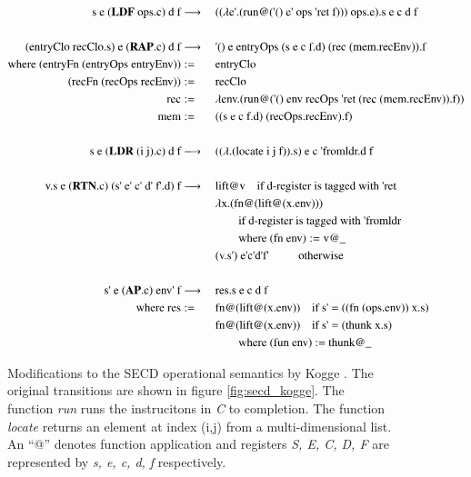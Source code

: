 \documentclass[a4paper,12pt,twoside,openright]{report}
\theoremstyle{definition}
\newcommand{\ts}{\textquotesingle}
\begin{document}
\begin{figure}[htp!]
\centering
\begin{alignat}{5}
		\text{s e (} \mathbf{LDF} \text{ ops.c) d f} & \longrightarrow \: && \text{(($\lambda$e{\ts}.(run@({\ts}() e{\ts} ops {\ts}ret f))) ops.e).s e c d f} \label{eq:secd_sem_ldf} \\
		\nonumber \\%
		\text{(entryClo recClo.s) e (} \mathbf{RAP}\text{.c) d f} & \longrightarrow \: && \text{{\ts}() e entryOps (s e c f.d) (rec (mem.recEnv)).f} \label{eq:secd_sem_rap} \\
		\text{where (entryFn (entryOps entryEnv))} & := && \text{entryClo} \nonumber \\
		\text{(recFn (recOps recEnv))} & := && \text{recClo} \nonumber \\
		\text{rec} & := && \text{$\lambda$env.(run@({\ts}() env recOps {\ts}ret (rec (mem.recEnv)).f))} \nonumber \\
		\text{mem} & := && \text{((s e c f.d) (recOps.recEnv).f)} \nonumber \\
		\nonumber \\%
		\text{s e (} \mathbf{LDR} \text{ (i j).c) d f} & \longrightarrow \: && \text{(($\lambda$.(locate i j f)).s) e c {\ts}fromldr.d f} \\
		\nonumber \\%
		\text{v.s e (} \mathbf{RTN}\text{.c) (s{\ts} e{\ts} c{\ts}  d{\ts}  f{\ts}.d) f} & \longrightarrow \:
		 && \text{lift@v} 									\quad	\text{if d-register is tagged with {\ts}ret}	\\
		 & && \text{$\lambda$x.(fn@(lift@(x.env)))} \nonumber \\
		 & && \qquad\text{if d-register is tagged with {\ts}fromldr} \nonumber \\
		 & && \qquad\text{where (fn env)} := \text{v@\_} \nonumber \\
 		 & && \text{(v.s\ts)  e\ts  c\ts  d\ts  f\ts}	\qquad\;\;\text{otherwise} \nonumber \\
 		\nonumber \\%
		\text{s{\ts} e (} \mathbf{AP}\text{.c) env{\ts} f} & \longrightarrow \: && \text{res.s e c d f} \\
		\text{where res} & := && \text{fn@(lift@(x.env))\textbf{\textbf{}}} \quad\text{if s{\ts} $=$ ((fn (ops.env)) x.s)} \nonumber \\
		& && \text{fn@(lift@(x.env))}\quad\text{if s{\ts} $=$ (thunk x.s)} \nonumber \\
		& && \qquad\text{where (fun env) $:=$ thunk@\_} \nonumber
\end{alignat}
\caption{Modifications to the SECD operational semantics by Kogge \cite{kogge1990architecture}. The original transitions are shown in figure \ref{fig:secd_kogge}. The function \textit{run} runs the instrucitons in \textit{C} to completion. The function \textit{locate} returns an element at index (i,j) from a multi-dimensional list. An ``@'' denotes function application and registers \textit{S, E, C, D, F} are represented by \textit{s, e, c, d, f} respectively.}
\label{fig:secd_semantics_noset}
\end{figure}
\endgroup
\newpage
\end{document}

